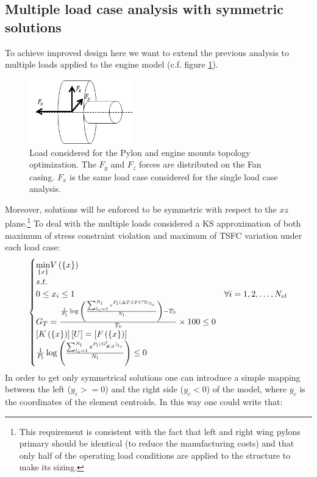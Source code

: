  \subsection{Multiple load case analysis with symmetric solutions}
 To achieve improved design here we want to extend the previous analysis to multiple loads applied to the engine model (c.f. figure \ref{fig.2.23}).
  \begin{figure}[ht]
  \centering
  \includegraphics[width=0.4\textwidth]{images/Ch2/Design_problem_multi_load}
  \caption{Load considered for the Pylon and engine mounts topology optimization. The $F_y$ and $F_z$ forces are distributed on the Fan casing. $F_x$ is the same load case considered for the single load case analysis.}
  \label{fig.2.23}
  \end{figure}
  Moreover, solutions will be enforced to be symmetric with respect to the $xz$ plane.\footnote{This requirement is consistent with the fact that left and right wing pylons primary should be identical (to reduce the manufacturing costs) and that only half of the operating load conditions are applied to the structure to make its sizing.}  To deal with the multiple loads considered a KS approximation of both maximum of stress constraint violation and maximum of TSFC variation under each load case:
 \begin{equation}
 \label{topoeq3}
 \begin{cases}
 \underset{\lbrace x\rbrace}{\min} V\left(\lbrace x\rbrace\right)& \\
 s.t. & \\ 0\leq x_i \leq 1  & \forall i=1,2,\dots,N_{el}\\
 G_T=\frac{\frac{1}{P_l}\log{\left(\frac{\sum_{l_c=1}^{N_l}e^{P_l(\Delta TSFC \% )_{l_c}}}{N_l}\right)}-T_0}{T_0}\times 100 \leq 0 & \\
 \left[K\left(\lbrace x\rbrace\right)\right]\left[{U}\right] = \left[{ F \left(\lbrace x\rbrace\right)}\right]& \\
 \frac{1}{P_l}\log{\left(\frac{\sum_{l_c=1}^{N_l}e^{P_l(G^{l}_{KS})_{l_c}}}{N_l}\right)}\leq 0
 \end{cases}
 \end{equation}
 In order to get only symmetrical solutions one can introduce a simple mapping between the left ($y_c>= 0$) and the right side ($y_c< 0$) of the model, where $y_c$ is the coordinates of the element centroids. In this way one could write that:
